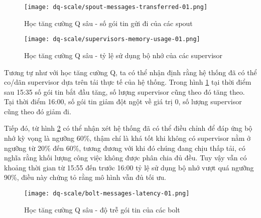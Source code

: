 \begin{figure}
    \centering
    \texttt{[image: dq-scale/spout-messages-transferred-01.png]}
    \caption{Học tăng cường Q sâu - số gói tin gửi đi của các spout}
    \label{fig:evaluate-dq-spout-messages-transferred}
\end{figure}

\begin{figure}
    \centering
    \texttt{[image: dq-scale/supervisors-memory-usage-01.png]}
    \caption{Học tăng cường Q sâu - tỷ lệ sử dụng bộ nhớ của các supervisor}
    \label{fig:evaluate-dq-memory-usage}
\end{figure}

Tương tự như với học tăng cường Q, ta có thể nhận định rằng hệ thống đã có thể co/dãn supervisor dựa trên tải thực tế của hệ thống. Trong hình \ref{fig:evaluate-dq-spout-messages-transferred} tại thời điểm sau 15:35 số gói tin bắt đầu tăng, số lượng supervisor cũng theo đó tăng theo. Tại thời điểm 16:00, số gói tin giảm đột ngột về giá trị 0, số lượng supervisor cũng theo đó giảm đi.


Tiếp đó, từ hình \ref{fig:evaluate-dq-memory-usage} có thể nhận xét hệ thống đã có thể điều chỉnh để đáp ứng bộ nhớ kỳ vọng là ngưỡng 60\%, thậm chí là khá tốt khi không có supervisor nằm ở ngưỡng từ 20\% đến 60\%, tương đương với khi đó chúng đang chịu thấp tải, có nghĩa rằng khối lượng công việc không được phân chia đủ đều. Tuy vậy vẫn có khoảng thời gian từ 15:55 đến trước 16:00 tỷ lệ sử dụng bộ nhớ vượt quá ngưỡng 90\%, điều này chứng tỏ rằng mô hình vẫn đủ tối ưu.

\begin{figure}
    \centering
    \texttt{[image: dq-scale/bolt-messages-latency-01.png]}
    \caption{Học tăng cường Q sâu - độ trễ gói tin của các bolt}
    \label{fig:evaluate-bolt-latency}
\end{figure}

